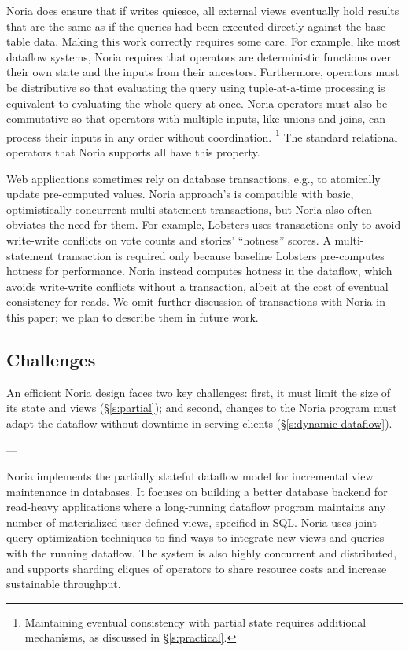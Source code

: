 Noria does ensure that if writes quiesce, all external views eventually hold
results that are the same as if the queries had been executed directly against
the base table data. Making this work correctly requires some care. For example,
like most dataflow systems, Noria requires that operators are deterministic
functions over their own state and the inputs from their ancestors. Furthermore,
operators must be distributive so that evaluating the query using
tuple-at-a-time processing is equivalent to evaluating the whole query at once.
Noria operators must also be commutative so that operators with multiple inputs,
like unions and joins, can process their inputs in any order without
coordination.%
\footnote{Maintaining eventual consistency with partial state requires
additional mechanisms, as discussed in \S\ref{s:practical}.}
The standard relational operators that Noria supports all have this property.


%
Web applications sometimes rely on database transactions, e.g., to atomically
update pre-computed values.
%
Noria approach's is compatible with basic, optimistically-concurrent
multi-statement transactions, but Noria also often obviates the need for them.
%
For example, Lobsters uses transactions only to avoid write-write conflicts on
vote counts and stories' ``hotness'' scores.
%
A multi-statement transaction is required only because baseline Lobsters
pre-computes hotness for performance.
%
Noria instead computes hotness in the dataflow, which avoids write-write
conflicts without a transaction, albeit at the cost of eventual consistency for
reads.
%
We omit further discussion of transactions with Noria in this paper; we plan to
describe them in future work.
%

\subsection{Challenges}

%
An efficient Noria design faces two key challenges: first, it must limit the
size of its state and views (\S\ref{s:partial}); and second, changes to the
Noria program must adapt the dataflow without downtime in serving clients
(\S\ref{s:dynamic-dataflow}).
%

---

Noria implements the partially stateful dataflow model for incremental view
maintenance in databases. It focuses on building a better database backend for
read-heavy applications where a long-running dataflow program maintains any
number of materialized user-defined views, specified in SQL. Noria uses joint
query optimization techniques to find ways to integrate new views and queries
with the running dataflow. The system is also highly concurrent and distributed,
and supports sharding cliques of operators to share resource costs and increase
sustainable throughput.

